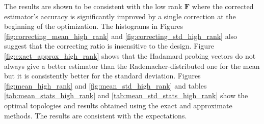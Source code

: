   The results are shown to be consistent with the low rank $\bm{F}$ where the corrected estimator's accuracy is significantly improved by a single correction at the beginning of the optimization. The histograms in Figures \ref{fig:correcting_mean_high_rank} and \ref{fig:correcting_std_high_rank} also suggest that the correcting ratio is insensitive to the design. Figure \ref{fig:exact_approx_high_rank} shows that the Hadamard probing vectors do not always give a better estimator than the Rademacher-distributed one for the mean but it is consistently better for the standard deviation. Figures \ref{fig:mean_high_rank} and \ref{fig:mean_std_high_rank} and tables \ref{tab:mean_stats_high_rank} and \ref{tab:mean_std_stats_high_rank} show the optimal topologies and results obtained using the exact and approximate methods. The results are consistent with the expectations.
